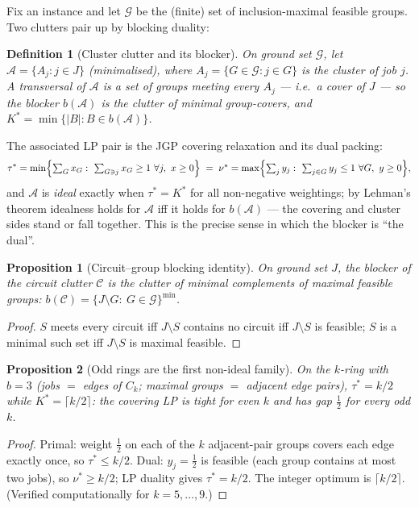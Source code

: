 \documentclass[11pt,a4paper]{article}
\newtheorem{proposition}{Proposition}
\newtheorem{definition}{Definition}
\newcommand{\Kstar}{K^{\ast}}
\begin{document}
Fix an instance and let $\mathcal{G}$ be the (finite) set of inclusion-maximal
feasible groups. Two clutters pair up by blocking duality:

\begin{definition}[Cluster clutter and its blocker]
On ground set $\mathcal{G}$, let
$\mathcal{A}=\{A_j: j\in J\}$ (minimalised), where
$A_j=\{G\in\mathcal{G}: j\in G\}$ is the \emph{cluster} of job $j$. A
transversal of $\mathcal{A}$ is a set of groups meeting every $A_j$ --- i.e.\
a \emph{cover} of $J$ --- so the blocker $b(\mathcal{A})$ is the clutter of
minimal group-covers, and $\Kstar=\min\{|B|:B\in b(\mathcal{A})\}$.
\end{definition}

\noindent The associated LP pair is the JGP covering relaxation and its dual
packing:
\[
  \tau^*=\min\Bigl\{\textstyle\sum_G x_G:\ \sum_{G\ni j}x_G\ge1\ \forall j,\
  x\ge0\Bigr\}
  \;=\;
  \nu^*=\max\Bigl\{\textstyle\sum_j y_j:\ \sum_{j\in G}y_j\le1\ \forall G,\
  y\ge0\Bigr\},
\]
and $\mathcal{A}$ is \emph{ideal} exactly when $\tau^*=\Kstar$ for all
non-negative weightings; by Lehman's theorem idealness holds for
$\mathcal{A}$ iff it holds for $b(\mathcal{A})$ --- the covering and cluster
sides stand or fall together. This is the precise sense in which the blocker
is ``the dual''.

\begin{proposition}[Circuit--group blocking identity]\label{prop:circblocker}
On ground set $J$, the blocker of the circuit clutter $\mathcal{C}$ is the
clutter of minimal complements of maximal feasible groups:
$b(\mathcal{C})=\{J\setminus G:\ G\in\mathcal{G}\}^{\min}$.
\end{proposition}
\begin{proof}
$S$ meets every circuit iff $J\setminus S$ contains no circuit iff
$J\setminus S$ is feasible; $S$ is a minimal such set iff $J\setminus S$ is
maximal feasible.
\end{proof}

\begin{proposition}[Odd rings are the first non-ideal family]\label{prop:oddring}
On the $k$-ring with $b=3$ (jobs $=$ edges of $C_k$; maximal groups $=$
adjacent edge pairs), $\tau^*=k/2$ while $\Kstar=\lceil k/2\rceil$: the
covering LP is tight for even $k$ and has gap $\tfrac12$ for every odd $k$.
\end{proposition}
\begin{proof}
Primal: weight $\tfrac12$ on each of the $k$ adjacent-pair groups covers each
edge exactly once, so $\tau^*\le k/2$. Dual: $y_j=\tfrac12$ is feasible (each
group contains at most two jobs), so $\nu^*\ge k/2$; LP duality gives
$\tau^*=k/2$. The integer optimum is $\lceil k/2\rceil$.
(Verified computationally for $k=5,\dots,9$.)
\end{proof}
\end{document}
